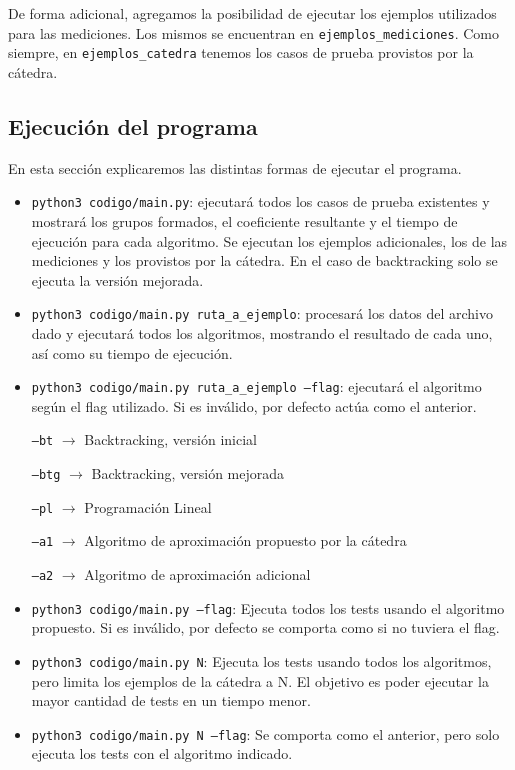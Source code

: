 \documentclass{article}
\begin{document}
De forma adicional, agregamos la posibilidad de ejecutar los ejemplos utilizados para las mediciones. Los mismos se encuentran en \texttt{ejemplos\_mediciones}. Como siempre, en \texttt{ejemplos\_catedra} tenemos los casos de prueba provistos por la cátedra.

\subsection{Ejecución del programa}

En esta sección explicaremos las distintas formas de ejecutar el programa.
\begin{itemize}
    \item \texttt{python3\ codigo/main.py}: ejecutará todos los casos de prueba existentes y mostrará los grupos formados, el coeficiente resultante y el tiempo de ejecución para cada algoritmo. Se ejecutan los ejemplos adicionales, los de las mediciones y los provistos por la cátedra. En el caso de backtracking solo se ejecuta la versión mejorada.
    \item \texttt{python3\ codigo/main.py\ ruta\_a\_ejemplo}: procesará los datos del archivo dado y ejecutará todos los algoritmos, mostrando el resultado de cada uno, así como su tiempo de ejecución. 
    \item \texttt{python3\ codigo/main.py ruta\_a\_ejemplo\ --flag}: ejecutará el algoritmo según el flag utilizado. Si es inválido, por defecto actúa como el anterior.
    
        \texttt{--bt} $\rightarrow$ Backtracking, versión inicial

        \texttt{--btg} $\rightarrow$ Backtracking, versión mejorada
        
        \texttt{--pl} $\rightarrow$ Programación Lineal
        
        \texttt{--a1} $\rightarrow$ Algoritmo de aproximación propuesto por la cátedra
        
        \texttt{--a2} $\rightarrow$ Algoritmo de aproximación adicional
    \item \texttt{python3\ codigo/main.py\ --flag}: Ejecuta todos los tests usando el algoritmo propuesto. Si es inválido, por defecto se comporta como si no tuviera el flag.

    \item \texttt{python3\ codigo/main.py\ N}: Ejecuta los tests usando todos los algoritmos, pero limita los ejemplos de la cátedra a N. El objetivo es poder ejecutar la mayor cantidad de tests en un tiempo menor.

    \item \texttt{python3\ codigo/main.py\ N\ --flag}: Se comporta como el anterior, pero solo ejecuta los tests con el algoritmo indicado.
        
\end{itemize}
\end{document}

